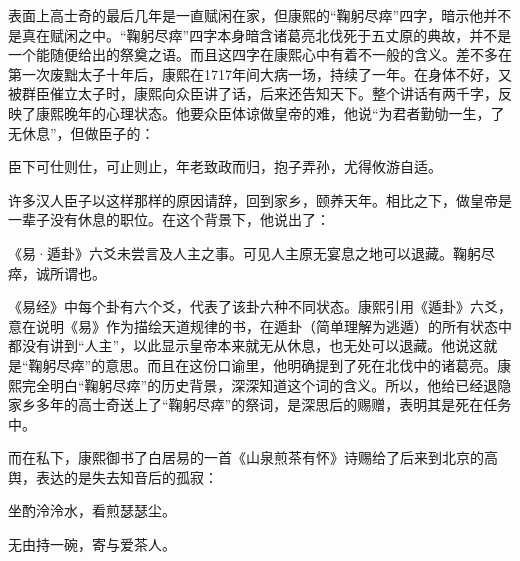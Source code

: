 
表面上高士奇的最后几年是一直赋闲在家，但康熙的“鞠躬尽瘁”四字，暗示他并不是真在赋闲之中。“鞠躬尽瘁”四字本身暗含诸葛亮北伐死于五丈原的典故，并不是一个能随便给出的祭奠之语。而且这四字在康熙心中有着不一般的含义。差不多在第一次废黜太子十年后，康熙在1717年间大病一场，持续了一年。在身体不好，又被群臣催立太子时，康熙向众臣讲了话，后来还告知天下。整个讲话有两千字，反映了康熙晚年的心理状态。他要众臣体谅做皇帝的难，他说“为君者勤劬一生，了无休息”，但做臣子的：



\begin{bookquote}臣下可仕则仕，可止则止，年老致政而归，抱子弄孙，尤得攸游自适。\end{bookquote}


许多汉人臣子以这样那样的原因请辞，回到家乡，颐养天年。相比之下，做皇帝是一辈子没有休息的职位。在这个背景下，他说出了：



\begin{bookquote}《易·遁卦》六爻未尝言及人主之事。可见人主原无宴息之地可以退藏。鞠躬尽瘁，诚所谓也。\end{bookquote}


《易经》中每个卦有六个爻，代表了该卦六种不同状态。康熙引用《遁卦》六爻，意在说明《易》作为描绘天道规律的书，在遁卦（简单理解为逃遁）的所有状态中都没有讲到“人主”，以此显示皇帝本来就无从休息，也无处可以退藏。他说这就是“鞠躬尽瘁”的意思。而且在这份口谕里，他明确提到了死在北伐中的诸葛亮。康熙完全明白“鞠躬尽瘁”的历史背景，深深知道这个词的含义。所以，他给已经退隐家乡多年的高士奇送上了“鞠躬尽瘁”的祭词，是深思后的赐赠，表明其是死在任务中。



而在私下，康熙御书了白居易的一首《山泉煎茶有怀》诗赐给了后来到北京的高舆，表达的是失去知音后的孤寂：



\begin{bookquote}坐酌泠泠水，看煎瑟瑟尘。\end{bookquote}


\begin{bookquote}无由持一碗，寄与爱茶人。\end{bookquote}


